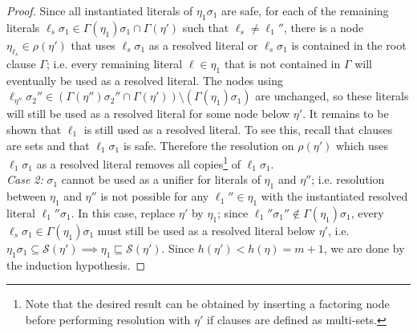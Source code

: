\begin{proof}
Since all instantiated literals of $\eta_1\sigma_1$ are safe, for each of the remaining literals $\ell_s \sigma_1 \in \Gamma(\eta_1)\sigma_1 \cap \Gamma(\eta')$ such that $\ell_s\neq \ell_1''$, there is a node $\eta_{\ell_s}\in \rho(\eta')$ that uses $\ell_s\sigma_1$ as a resolved literal or $\ell_s\sigma_1$ is contained in the root clause $\Gamma$; i.e. every remaining literal $\ell \in \eta_1$ that is not contained in $\Gamma$ will eventually be used as a resolved literal. The nodes using $\ell_{\eta''}\sigma_2'' \in (\Gamma(\eta'')\sigma_2''\cap\Gamma(\eta'))\setminus (\Gamma(\eta_1)\sigma_1)$ are unchanged, so these literals will still be used as a resolved literal for some node below $\eta'$. 
It remains to be shown that $\ell_1$ is still used as a resolved literal. To see this, recall that clauses are sets and that $\ell_1\sigma_1$ is safe. Therefore the resolution on $\rho(\eta')$ which uses $\ell_1\sigma_1$ as a resolved literal removes all copies\footnote{Note that the desired result can be obtained by inserting a factoring node before performing resolution with $\eta'$ if clauses are defined as multi-sets.} of $\ell_1\sigma_1$. \\


\noindent
\emph{Case 2:} $\sigma_1$ cannot be used as a unifier for literals of $\eta_1$ and $\eta''$; i.e. resolution between $\eta_1$ and $\eta''$ is not possible for any $\ell_1''\in \eta_1$ 
with the instantiated resolved literal $\ell_1''\sigma_1$. In this case, replace $\eta'$ by $\eta_1$; since $\ell_1''\sigma_1'' \notin \Gamma(\eta_1)\sigma_1$, every $\ell_s\sigma_1 \in \Gamma(\eta_1)\sigma_1$ must still be used as a resolved literal below $\eta'$, i.e. $\eta_1\sigma_1 \subseteq \mathcal{S}(\eta') \implies \eta_1 \sqsubseteq \mathcal{S}(\eta')$. Since $h(\eta') < h(\eta)=m+1$, we are done by the induction hypothesis. 


\end{proof}

